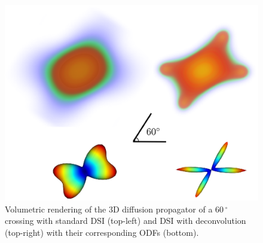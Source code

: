 \documentclass{bioinfo}
\begin{document}
\begin{figure}
\includegraphics[scale=0.60]{Figures/pdf_odf_60.eps}
\centering{}
\caption{Volumetric rendering of the 3D diffusion propagator of a $60\,^{\circ}$ crossing with standard DSI (top-left) and DSI with deconvolution (top-right) with their corresponding ODFs (bottom).\label{Fig:pdf}}
\end{figure}
\end{document}
